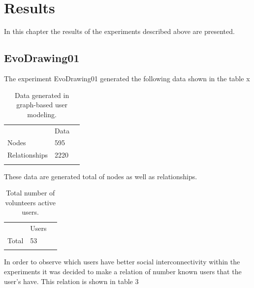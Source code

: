 \chapter{Results} \label{sec:6}
In this chapter the results of the experiments described above are presented.


\section{EvoDrawing01}

The experiment EvoDrawing01 generated the following data shown in the table x


\begin{table}
\small
\caption{Data generated in graph-based user modeling.}
\label{tab:dataGenerated_1} 
\centering
\small
\begin{tabular}{p{3cm} p{3cm} p{3cm} }
\hline\noalign{\smallskip}
  & Data &  \\
\noalign{\smallskip}\hline\noalign{\smallskip}
\small{Nodes} & \small{595} & \\ \hline  
\small{Relationships} & \small{2220} & \\ \hline  
  
\noalign{\smallskip}\hline
\end{tabular}
\end{table}


These data are generated total of nodes as well as relationships.

\begin{table}
\small
\caption{Total number of volunteers active users.}
\label{tab:totalUsers_1} 
\centering
\small
\begin{tabular}{p{3cm} p{3cm} p{3cm} }
\hline\noalign{\smallskip}
  & Users &  \\
\noalign{\smallskip}\hline\noalign{\smallskip}
\small{Total } & \small{53} & \\ \hline    
\noalign{\smallskip}\hline
\end{tabular}
\end{table}

In order to observe which users have better social interconnectivity within the
experiments it was decided to make a relation of number known users that the
user’s have. This relation is shown in table 3

